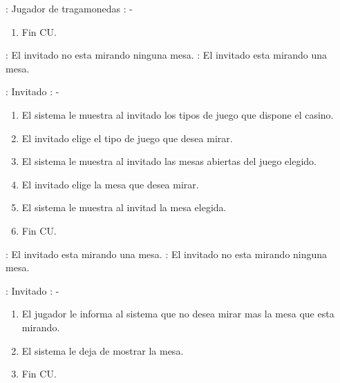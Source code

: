 : Jugador de tragamonedas \newline
\indent{}: -

\begin{enumerate}
\item Fin CU.
\end{enumerate}




: El invitado no esta mirando ninguna mesa. \newline
\indent{}: El invitado esta mirando una mesa.

: Invitado \newline
\indent{}: -

\begin{enumerate}
\item El sistema le muestra al invitado los tipos de juego que dispone el casino.
\item El invitado elige el tipo de juego que desea mirar.
\item El sistema le muestra al invitado las mesas abiertas del juego elegido.
\item El invitado elige la mesa que desea mirar.
\item El sistema le muestra al invitad la mesa elegida.
\item Fin CU.
\end{enumerate}




: El invitado esta mirando una mesa. \newline
\indent{}: El invitado no esta mirando ninguna mesa.

: Invitado \newline
\indent{}: -

\begin{enumerate}
\item El jugador le informa al sistema que no desea mirar mas la mesa que esta mirando.
\item El sistema le deja de mostrar la mesa.
\item Fin CU.
\end{enumerate}




